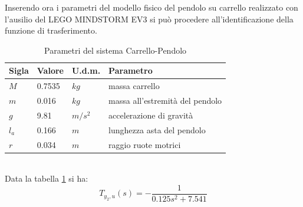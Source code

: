 Inserendo ora i parametri del modello fisico del pendolo su  carrello realizzato con l'ausilio del LEGO MINDSTORM EV3 si può procedere all'identificazione della funzione di trasferimento.
\begin{table}[ht]
	\begin{tabular}{|l|l|l|l|}
		\hline
		\textbf{Sigla} & \textbf{Valore} & \textbf{U.d.m.} & \textbf{Parametro}\\
		\hline
		$M$ & 0.7535 & $kg$ & massa carrello\\
		\hline
		$m$ & 0.016 & $kg$ & massa all'estremità del pendolo\\
		\hline
		$g$ & 9.81 & $m/s^2$ & accelerazione di gravità\\
		\hline
		$l_a$ & 0.166 & $m$ & lunghezza asta del pendolo\\
		\hline
		$r$ & 0.034 & $m$ & raggio ruote motrici\\
		\hline
	
	\end{tabular}	
\caption{Parametri del sistema Carrello-Pendolo}
\label{carrPend}
\end{table}
\\Data la tabella \ref{carrPend} si ha:
$$T_{y_2,u}(s)=-\displaystyle\frac{1}{0.125s^2+7.541}$$
\newpage
